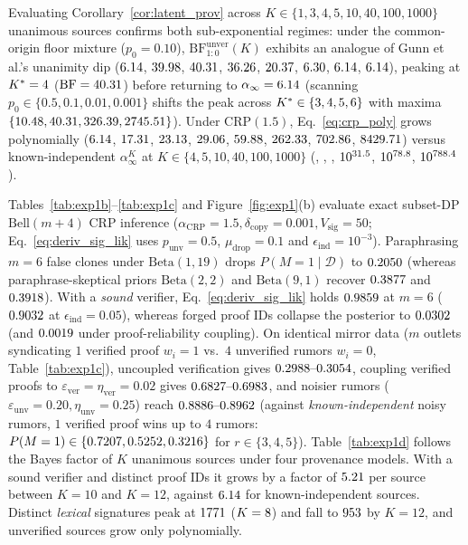 \documentclass[11pt,a4paper]{article}
\theoremstyle{definition}
\theoremstyle{remark}
\newcommand{\BF}{\mathrm{BF}}
\begin{document}
Evaluating Corollary~\ref{cor:latent_prov} across $K \in \{1, 3, 4, 5, 10, 40, 100, 1000\}$ unanimous sources confirms both sub-exponential regimes: under the common-origin floor mixture ($p_0 = 0.10$), $\BF_{1:0}^{\mathrm{unver}}(K)$ exhibits an analogue of Gunn et al.'s unanimity dip \cite{gunn2016too} ($6.14$, $39.98$, $40.31$, $36.26$, $20.37$, $6.30$, $6.14$, $6.14$), peaking at $K^* = 4$ ($\BF = \resPeakTenthBF$) before returning to $\alpha_\infty = 6.14$ (scanning $p_0 \in \{0.5, 0.1, 0.01, 0.001\}$ shifts the peak across $K^* \in \{3, 4, 5, 6\}$ with maxima $\{10.48, 40.31, 326.39, 2745.51\}$). Under $\mathrm{CRP}(1.5)$, Eq.~\eqref{eq:crp_poly} grows polynomially ($6.14$, $17.31$, $23.13$, $29.06$, $59.88$, $262.33$, $702.86$, $8429.71$) versus known-independent $\alpha_\infty^K$ at $K \in \{4, 5, 10, 40, 100, 1000\}$ (\resIndKFour, \resIndKFive, \resIndKTen, $10^{31.5}$, $10^{78.8}$, $10^{788.4}$).

Tables~\ref{tab:exp1b}--\ref{tab:exp1c} and Figure~\ref{fig:exp1}(b) evaluate exact subset-DP $\mathrm{Bell}(m + 4)$ CRP inference ($\alpha_{\mathrm{CRP}} = 1.5, \delta_{\mathrm{copy}} = 0.001, V_{\mathrm{sig}} = 50$; Eq.~\eqref{eq:deriv_sig_lik} uses $p_{\mathrm{unv}} = 0.5$, $\mu_{\mathrm{drop}} = 0.1$ and $\epsilon_{\mathrm{ind}} = 10^{-3}$). Paraphrasing $m=6$ false clones under $\mathrm{Beta}(1,19)$ drops $P(M=1 \mid \mathcal{D})$ to $0.2050$ (whereas paraphrase-skeptical priors $\mathrm{Beta}(2,2)$ and $\mathrm{Beta}(9,1)$ recover $0.3877$ and $0.3918$). With a \emph{sound} verifier, Eq.~\eqref{eq:deriv_sig_lik} holds $0.9859$ at $m=6$ ($0.9032$ at $\epsilon_{\mathrm{ind}} = 0.05$), whereas forged proof IDs collapse the posterior to $0.0302$ (and $0.0019$ under proof-reliability coupling). On identical mirror data ($m$ outlets syndicating $1$ verified proof $w_i=1$ vs.\ $4$ unverified rumors $w_i=0$, Table~\ref{tab:exp1c}), uncoupled verification gives $0.2988\text{--}0.3054$, coupling verified proofs to $\varepsilon_{\mathrm{ver}}=\eta_{\mathrm{ver}}=0.02$ gives $0.6827\text{--}0.6983$, and noisier rumors ($\varepsilon_{\mathrm{unv}}=0.20, \eta_{\mathrm{unv}}=0.25$) reach $0.8886\text{--}0.8962$ (against \emph{known-independent} noisy rumors, $1$ verified proof wins up to $4$ rumors: $P(M=1) \in \{0.7207, 0.5252, 0.3216\}$ for $r \in \{3, 4, 5\}$). Table~\ref{tab:exp1d} follows the Bayes factor of $K$ unanimous sources under four provenance models. With a sound verifier and distinct proof IDs it grows by a factor of $5.21$ per source between $K=10$ and $K=12$, against $6.14$ for known-independent sources. Distinct \emph{lexical} signatures peak at $1771$ ($K = 8$) and fall to $953$ by $K=12$, and unverified sources grow only polynomially.
\end{document}
